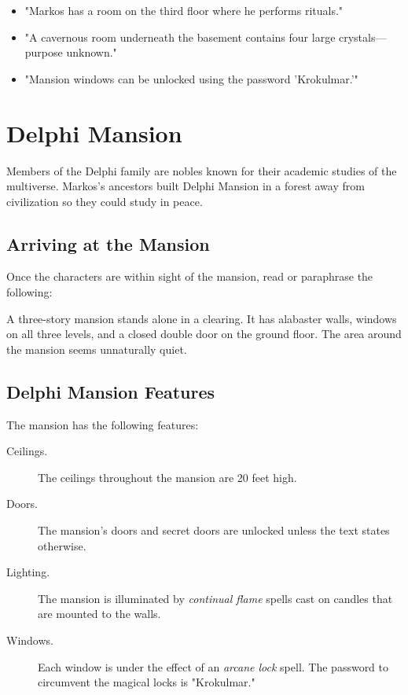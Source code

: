 \documentclass[10pt,a4paper,twoside,bg=print,twocolumn,openany,nodeprecatedcode]{dndbook}
\begin{document}
\begin{itemize}
\item "Markos has a room on the third floor where he performs rituals."
\item "A cavernous room underneath the basement contains four large crystals—purpose unknown."
\item "Mansion windows can be unlocked using the password 'Krokulmar.'"
\end{itemize}

\section{Delphi Mansion}
Members of the Delphi family are nobles known for their academic studies of the multiverse. Markos's ancestors built Delphi Mansion in a forest away from civilization so they could study in peace.

\subsection{Arriving at the Mansion}
Once the characters are within sight of the mansion, read or paraphrase the following:

\begin{DndReadAloud}{}
A three-story mansion stands alone in a clearing. It has alabaster walls, windows on all three levels, and a closed double door on the ground floor. The area around the mansion seems unnaturally quiet.

\end{DndReadAloud}

\subsection{Delphi Mansion Features}
The mansion has the following features:


\begin{description}
\item[Ceilings.]
The ceilings throughout the mansion are 20 feet high.
\item[Doors.]
The mansion's doors and secret doors are unlocked unless the text states otherwise.
\item[Lighting.]
The mansion is illuminated by \textit{continual flame} spells cast on candles that are mounted to the walls.
\item[Windows.]
Each window is under the effect of an \textit{arcane lock} spell. The password to circumvent the magical locks is "Krokulmar."
\end{description}
\end{document}

